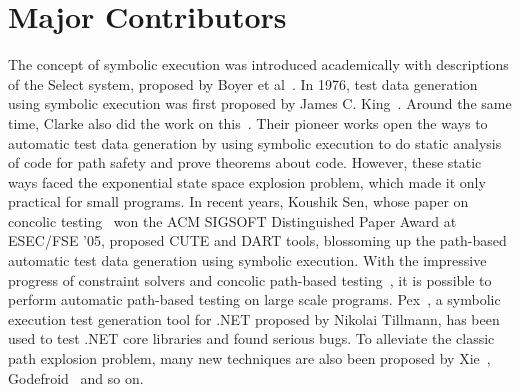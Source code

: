 \section{Major Contributors}
The concept of symbolic execution was introduced academically with descriptions of the Select system, proposed by Boyer et al~\cite{select}. In 1976, test data generation using symbolic execution was first proposed by James C. King~\cite{symbolic}. Around the same time, Clarke also did the work on this~\cite{test76}. Their pioneer works open the ways to automatic test data generation by using symbolic execution to do static analysis of code for path safety and prove theorems about code. However, these static ways faced the exponential state space explosion problem, which made it only practical for small programs. In recent years, Koushik Sen, whose paper on concolic testing~\cite{dart} won the ACM SIGSOFT Distinguished Paper Award at ESEC/FSE '05, proposed CUTE and DART tools, blossoming up the path-based automatic test data generation using symbolic execution. With the impressive progress of constraint solvers and concolic path-based testing~\cite{extenjpf,structural,mixed,exe,fuzz,pex}, it is possible to perform automatic path-based testing on large scale programs. Pex~\cite{pex}, a symbolic execution test generation tool for .NET proposed by Nikolai Tillmann, has been used to test .NET core libraries and found serious bugs. To alleviate the classic path explosion problem, many new techniques are also been proposed by Xie~\cite{fitness}, Godefroid~\cite{compositional} and so on.
